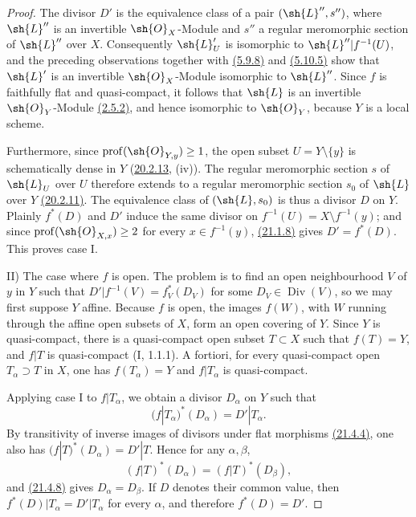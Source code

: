 \begin{proof}
The divisor $D'$ is the equivalence class of a pair
$(\sh{L}'',s'')$, where $\sh{L}''$ is an invertible $\sh{O}_X$-Module
and $s''$ a regular meromorphic section of $\sh{L}''$ over $X$.
Consequently $\sh{L}'_U$ is isomorphic to
$\sh{L}''|f^{-1}(U)$, and the preceding observations together with
{\hyperlink{ega4.c04.prop.5-9-8}{(5.9.8)}} and {\hyperlink{ega4.c04.thm.5-10-5}{(5.10.5)}} show that $\sh{L}'$ is an invertible
$\sh{O}_X$-Module isomorphic to $\sh{L}''$.  Since $f$ is faithfully
flat and quasi-compact, it follows that $\sh{L}$ is an invertible
$\sh{O}_Y$-Module {\hyperlink{ega4.c04.prop.2-5-2}{(2.5.2)}}, and hence isomorphic to $\sh{O}_Y$, because
$Y$ is a local scheme.

Furthermore, since $\operatorname{prof}(\sh{O}_{Y,y})\geq 1$, the open
subset $U=Y\setminus\{y\}$ is schematically dense in $Y$
({\hyperlink{ega4.c04.statement.20-2-13}{20.2.13}}, (iv)).  The regular meromorphic section $s$ of $\sh{L}_U$
over $U$ therefore extends to a regular meromorphic section $s_0$ of
$\sh{L}$ over $Y$ {\hyperlink{ega4.c04.prop.20-2-11}{(20.2.11)}}.  The equivalence class of
$(\sh{L},s_0)$ is thus a divisor $D$ on $Y$.  Plainly $f^*(D)$ and
$D'$ induce the same divisor on
$f^{-1}(U)=X\setminus f^{-1}(y)$; and since
$\operatorname{prof}(\sh{O}_{X,x})\geq 2$ for every
$x\in f^{-1}(y)$, {\hyperlink{ega4.c04.prop.21-1-8}{(21.1.8)}} gives $D'=f^*(D)$.  This proves case I.

\textup{II) The case where $f$ is open.}
The problem is to find an open neighbourhood $V$ of $y$ in $Y$ such
that $D'|f^{-1}(V)=f_V^*(D_V)$ for some
$D_V\in\operatorname{Div}(V)$, so we may first suppose $Y$ affine.
Because $f$ is open, the images $f(W)$, with $W$ running through the
affine open subsets of $X$, form an open covering of $Y$.  Since $Y$
is quasi-compact, there is a quasi-compact open subset $T\subset X$
such that $f(T)=Y$, and $f|T$ is quasi-compact (I, 1.1.1).  A fortiori,
for every quasi-compact open $T_\alpha\supset T$ in $X$, one has
$f(T_\alpha)=Y$ and $f|T_\alpha$ is quasi-compact.

Applying case I to $f|T_\alpha$, we obtain a divisor $D_\alpha$ on
$Y$ such that
\[
 (f|T_\alpha)^*(D_\alpha)=D'|T_\alpha.
\]
By transitivity of inverse images of divisors under flat morphisms
{\hyperlink{ega4.c04.statement.21-4-4}{(21.4.4)}}, one also has
$(f|T)^*(D_\alpha)=D'|T$.  Hence for any $\alpha,\beta$,
\[
 (f|T)^*(D_\alpha)=(f|T)^*(D_\beta),
\]
and {\hyperlink{ega4.c04.prop.21-4-8}{(21.4.8)}} gives $D_\alpha=D_\beta$.  If $D$ denotes their common
value, then $f^*(D)|T_\alpha=D'|T_\alpha$ for every $\alpha$, and
therefore $f^*(D)=D'$.
\end{proof}

